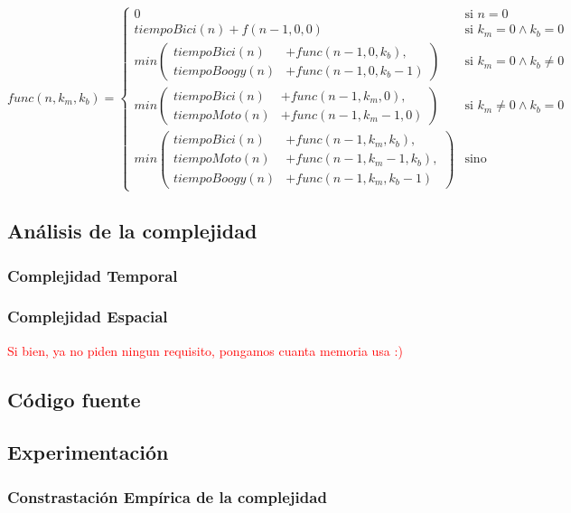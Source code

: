 \begin{equation*}
func(n, k_m, k_b) = 
\begin{cases} 
       0  & \mbox{si } n = 0  \\[2ex]
       tiempoBici(n) + f(n-1, 0, 0)  & \mbox{si } k_m=0 \wedge k_b=0 \\[2ex]
      min \left(
      \begin{split}
       tiempoBici(n) & + func(n-1, 0, k_b) , \\
       tiempoBoogy(n) & + func(n-1, 0, k_b-1)
\end{split} \right) & \mbox{si } k_m=0 \wedge k_b\neq0 \\[3ex]
      min \left(
      \begin{split}
       tiempoBici(n) & + func(n-1, k_m, 0) , \\
       tiempoMoto(n) & + func(n-1, k_m-1, 0)
\end{split} \right) & \mbox{si } k_m\neq0 \wedge k_b=0 \\[3ex]
           min \left(
      \begin{split}
       tiempoBici(n) & + func(n-1, k_m, k_b) , \\
       tiempoMoto(n) & + func(n-1, k_m-1, k_b) , \\
       tiempoBoogy(n) & + func(n-1, k_m, k_b-1)
\end{split} \right) & \mbox{sino}
\end{cases} 
\end{equation*}


\subsection{An\'alisis de la complejidad}
\subsubsection{Complejidad Temporal}
\subsubsection{Complejidad Espacial}
\textcolor{red}{Si bien, ya no piden ningun requisito, pongamos cuanta memoria usa :)}
\subsection{C\'odigo fuente}
\subsection{Experimentaci\'on}

\subsubsection{Constrastaci\'on Emp\'irica de la complejidad}